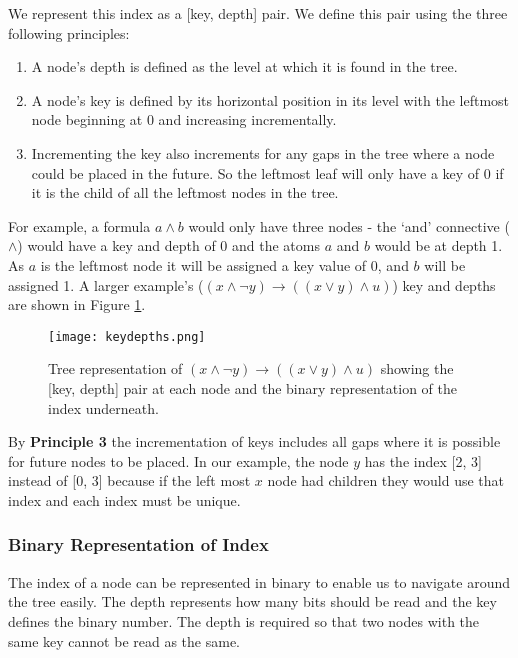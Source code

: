 \documentclass{report}
\begin{document}
We represent this index as a [key, depth] pair. We define this pair using the three following principles:

\begin{enumerate}[leftmargin=*, align=left, label=\bfseries Principle \arabic*:]
\item A node's depth is defined as the level at which it is found in the tree. 

\item A node's key is defined by its horizontal position in its level with the leftmost node beginning at 0 and increasing incrementally.

\item Incrementing the key also increments for any gaps in the tree where a node could be placed in the future. So the leftmost leaf will only have a key of 0 if it is the child of all the leftmost nodes in the tree.
\end{enumerate}

For example, a formula $a\land b$ would only have three nodes - the `and' connective ($\land$) would have a key and depth of 0 and the atoms $a$ and $b$ would be at depth 1. As $a$ is the leftmost node it will be assigned a key value of 0, and $b$ will be assigned 1. A larger example's ($(x\land\lnot y)\rightarrow((x\lor y)\land u)$) key and depths are shown in Figure \ref{keydepths}. 

\begin{figure}[ht]
    \centering
    \texttt{[image: keydepths.png]}
    \caption{Tree representation of $(x\land\lnot y)\rightarrow((x\lor y)\land u)$ showing the [key, depth] pair at each node and the binary representation of the index underneath.}
    \label{keydepths}
\end{figure}

By \textbf{Principle 3} the incrementation of keys includes all gaps where it is possible for future nodes to be placed. In our example, the node $y$ has the index [2, 3] instead of [0, 3] because if the left most $x$ node had children they would use that index and each index must be unique.

\subsubsection{Binary Representation of Index}

The index of a node can be represented in binary to enable us to navigate around the tree easily. The depth represents how many bits should be read and the key defines the binary number. The depth is required so that two nodes with the same key cannot be read as the same. 
\end{document}
